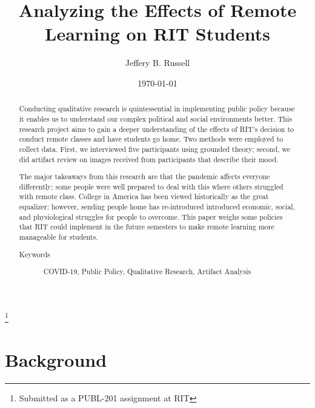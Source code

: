 \documentclass[12pt,
 reprint,
nofootinbib,
 amsmath,amssymb,
 aps,
floatfix,
]{revtex4-2}
\begin{document}

\title{Analyzing the Effects of Remote Learning on RIT Students}
\thanks{Submitted as a PUBL-201 assignment at RIT}%

\author{Jeffery B. Russell}
%

\date{\today}%




\begin{abstract}
Conducting qualitative research is quintessential in implementing public policy because it enables us to understand our complex political and social environments better.
This research project aims to gain a deeper understanding of the effects of RIT's decision to conduct remote classes and have students go home. Two methods were employed to collect data. First, we interviewed five participants using grounded theory; second, we did artifact review on images received from participants that describe their mood. 

The major takeaways from this research are that the pandemic affects everyone differently; some people were well prepared to deal with this where others struggled with remote class. College in America has been viewed historically as the great equalizer; however, sending people home has re-introduced introduced economic, social, and physiological struggles for people to overcome. This paper weighs some policies that RIT could implement in the future semesters to make remote learning more manageable for students. 

\begin{description}
\item[Keywords]
COVID-19, Public Policy, Qualitative Research, Artifact Analysis
\end{description}

\end{abstract}
\maketitle





\section{Background}
\end{document}

